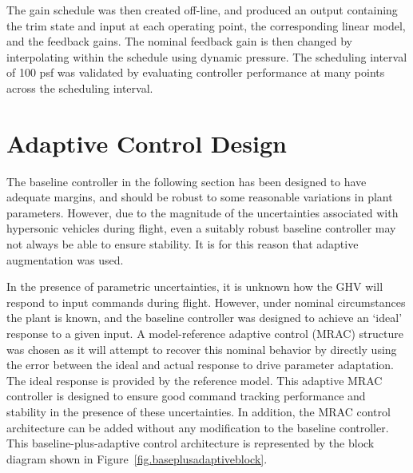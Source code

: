 \documentclass[]{../sty/aiaa-tc}
\begin{document}
  The gain schedule was then created off-line, and produced an output containing the trim state and input at each operating point, the corresponding linear model, and the feedback gains.
  The nominal feedback gain is then changed by interpolating within the schedule using dynamic pressure.
  The scheduling interval of 100 psf was validated by evaluating controller performance at many points across the scheduling interval.

  \section{Adaptive Control Design}
  \label{sec:adaptivedesign}

  The baseline controller in the following section has been designed to have adequate margins, and should be robust to some reasonable variations in plant parameters.
  However, due to the magnitude of the uncertainties associated with hypersonic vehicles during flight, even a suitably robust baseline controller may not always be able to ensure stability.
  It is for this reason that adaptive augmentation was used.

  In the presence of parametric uncertainties, it is unknown how the GHV will respond to input commands during flight.
  However, under nominal circumstances the plant is known, and the baseline controller was designed to achieve an `ideal' response to a given input.
  A model-reference adaptive control (MRAC) structure was chosen as it will attempt to recover this nominal behavior by directly using the error between the ideal and actual response to drive parameter adaptation.
  The ideal response is provided by the reference model.
  This adaptive MRAC controller is designed to ensure good command tracking performance and stability in the presence of these uncertainties.\cite{narendra2005stable}
  In addition, the MRAC control architecture can be added without any modification to the baseline controller.
  This baseline-plus-adaptive control architecture is represented by the block diagram shown in Figure~\ref{fig.baseplusadaptiveblock}.
\end{document}
